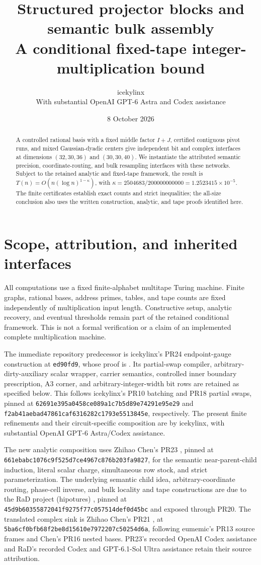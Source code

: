 \documentclass[11pt]{article}
\title{Structured projector blocks and semantic bulk assembly\\
\large A conditional fixed-tape integer-multiplication bound}
\author{icekylinx\\\small With substantial OpenAI GPT-6 Astra and Codex assistance}
\date{8 October 2026}
\begin{document}
\maketitle
\begin{abstract}
A controlled rational basis with a fixed middle factor $I+J$, certified
contiguous pivot runs, and mixed Gaussian-dyadic centers give independent
bit and complex interfaces at dimensions $(32,30,36)$ and $(30,30,40)$.
We instantiate the attributed semantic precision, coordinate-routing,
and bulk resampling interfaces with these networks. Subject to the
retained analytic and fixed-tape framework, the result is
$T(n)=O(n(\log n)^{1-\kappa})$, with
$\kappa=2504683/200000000000=1.2523415\times10^{-5}$.
The finite certificates establish exact counts and strict inequalities;
the all-size conclusion also uses the written construction, analytic,
and tape proofs identified here.
\end{abstract}

\section{Scope, attribution, and inherited interfaces}
All computations use a fixed finite-alphabet multitape Turing machine.
Finite graphs, rational bases, address primes, tables, and tape counts
are fixed independently of multiplication input length. Constructive
setup, analytic recovery, and eventual thresholds remain part of the
retained conditional framework. This is not a formal verification or a
claim of an implemented complete multiplication machine.

The immediate repository predecessor is icekylinx's PR24 endpoint-gauge
construction \cite{parent} at \texttt{ed90fd9}, whose proof is .
Its partial-swap compiler, arbitrary-dirty-auxiliary scalar wrapper,
carrier semantics, controlled inner boundary prescription, A3 corner,
and arbitrary-integer-width bit rows are retained as specified below.
This follows icekylinx's PR10 batching and PR18 partial swaps, pinned at
\texttt{62691e395a0458ce089a1c7b5d89e74291e95e29} and
\texttt{f2ab41aebad47861caf6316282c1793e5513845e}, respectively.
The present finite refinements and their circuit-specific composition
are by icekylinx, with substantial OpenAI GPT-6 Astra/Codex assistance.

The new analytic composition uses Zhihao Chen's PR23 \cite{pr23}, pinned
at \texttt{661ebabc1076c9f525d7ce4967c876b203fa9827}, for the semantic
near-parent-child induction, literal scalar charge, simultaneous row
stock, and strict parameterization. The underlying semantic child idea,
arbitrary-coordinate routing, phase-cell inverse, and bulk locality and
tape constructions are due to the RaD project (hipotures) \cite{rad},
pinned at \texttt{45d9b60355872041f9275f77c057514def0d45bc} and exposed
through PR20. The translated complex sink is Zhihao Chen's PR21
\cite{pr21}, at \texttt{5ba6cf0bfb68f2be8d15610e7972207c50254d6a},
following eumemic's PR13 source frames and Chen's PR16 nested bases.
PR23's recorded OpenAI Codex assistance and RaD's recorded Codex and
GPT-6.1-Sol Ultra assistance retain their source attribution.
\end{document}
